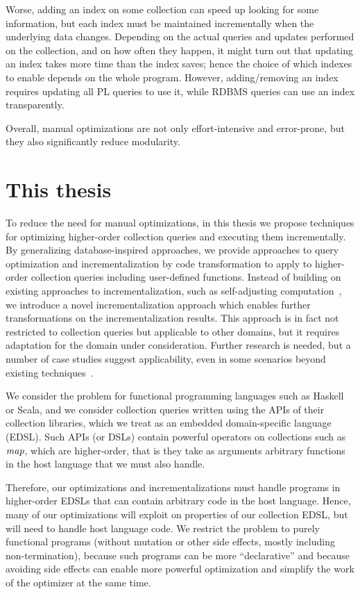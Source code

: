 Worse, adding an index on some collection can speed up looking
for some information, but each index must be maintained incrementally when the
underlying data changes. Depending on the actual queries and updates performed
on the collection, and on how often they happen, it might turn out that updating
an index takes more time than the index saves; hence the choice of which indexes
to enable depends on the whole program. However, adding/removing an index
requires updating all PL queries to use it, while RDBMS queries can use an index
transparently.

Overall, manual optimizations are not only effort-intensive and error-prone, but
they also significantly reduce modularity.

\section{This thesis}
To reduce the need for manual optimizations, in this thesis we propose
techniques for optimizing higher-order collection queries and executing them
incrementally.
%
By generalizing database-inspired approaches, we provide approaches to query optimization and
incrementalization by code transformation to apply to higher-order collection
queries including user-defined functions.
%
Instead of building on existing approaches to incrementalization, such as
self-adjusting computation~\citep{Acar09}, we introduce a novel
incrementalization approach which enables further transformations on the
incrementalization results. This approach is in fact not restricted to
collection queries but applicable to other domains, but it requires adaptation
for the domain under consideration.
%
Further research is needed, but a number of case studies suggest
applicability, even in some scenarios beyond existing
techniques~\citep{Koch2016incremental}.

We consider the problem for functional programming languages such as Haskell or
Scala, and we consider collection queries written using the APIs of their
collection libraries, which we treat as an embedded domain-specific language
(EDSL). Such APIs (or DSLs) contain powerful operators on collections such as
$\mathit{map}$,
which are higher-order, that
is they take as arguments arbitrary functions in the host language that we must
also handle.

Therefore, our optimizations and incrementalizations must handle programs in
higher-order EDSLs that can contain arbitrary code in the host language. Hence,
many of our optimizations will exploit on properties of our collection EDSL, but
will need to handle host language code. We restrict the problem to purely
functional programs (without mutation or other side effects, mostly including
non-termination), because such programs can be more ``declarative'' and because
avoiding side effects can enable more powerful optimization and simplify the
work of the optimizer at the same time.

